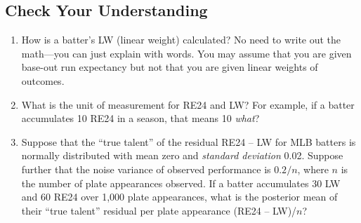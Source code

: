 \documentclass{article}
\begin{document}
    \subsection{\sc Check Your Understanding}

      \begin{enumerate}
        \item How is a batter's LW (linear weight) calculated? No need to write out the math---you can just explain with words. You may assume that you are given base-out run expectancy but not that you are given linear weights of outcomes.
        \item What is the unit of measurement for RE24 and LW? For example, if a batter accumulates 10 RE24 in a season, that means 10 {\it what}?
        \item Suppose that the ``true talent'' of the residual RE24 -- LW for MLB batters is normally distributed with mean zero and {\it standard deviation} 0.02. Suppose further that the noise variance of observed performance is $0.2/n$, where $n$ is the number of plate appearances observed. If a batter accumulates 30 LW and 60 RE24 over 1,000 plate appearances, what is the posterior mean of their ``true talent'' residual per plate appearance (RE24 -- LW)/$n$?
      \end{enumerate}
\end{document}
